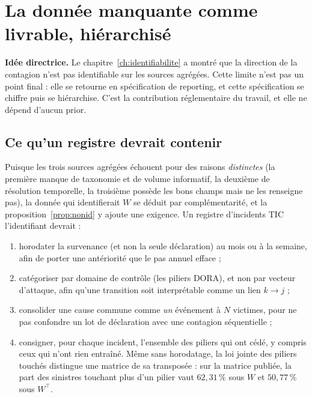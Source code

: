 \chapter{La donnée manquante comme livrable, hiérarchisé}
\label{ch:livrable}

\begin{cle}
\textbf{Idée directrice.} Le chapitre~\ref{ch:identifiabilite} a montré que la direction de la
contagion n'est pas identifiable sur les sources agrégées. Cette limite n'est pas un point final :
elle se retourne en spécification de reporting, et cette spécification se chiffre
puis se hiérarchise. C'est la contribution réglementaire du travail, et elle ne dépend
d'aucun prior.
\end{cle}

\section{Ce qu'un registre devrait contenir}

Puisque les trois sources agrégées échouent pour des raisons \emph{distinctes} (la première
manque de taxonomie et de volume informatif, la deuxième de résolution temporelle, la troisième
possède les bons champs mais ne les renseigne pas), la donnée qui identifierait $W$ se déduit
par complémentarité, et la proposition~\ref{prop:nonid} y ajoute une exigence. Un registre
d'incidents TIC l'identifiant devrait :
\begin{enumerate}[itemsep=2pt]
\item horodater la survenance (et non la seule déclaration) au mois ou à la
      semaine, afin de porter une antériorité que le pas annuel efface ;
\item catégoriser par domaine de contrôle (les piliers DORA), et non par vecteur
      d'attaque, afin qu'une transition soit interprétable comme un lien $k \to j$ ;
\item consolider une cause commune comme \emph{un} événement à $N$ victimes, pour ne pas
      confondre un lot de déclaration avec une contagion séquentielle ;
\item consigner, pour chaque incident, l'ensemble des piliers qui ont cédé, y compris ceux qui
      n'ont rien entraîné. Même sans horodatage, la loi jointe des piliers touchés distingue une
      matrice de sa transposée : sur la matrice publiée, la part des sinistres touchant plus d'un
      pilier vaut $62{,}31\,\%$ sous $W$ et $50{,}77\,\%$ sous $W^\top$.
\end{enumerate}

